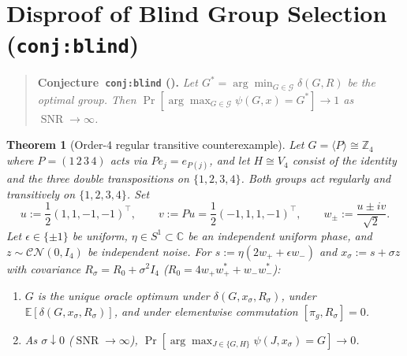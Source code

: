 \documentclass[11pt]{article}
\theoremstyle{plain}
\newtheorem{theorem}{Theorem}
\theoremstyle{definition}
\theoremstyle{remark}
\DeclareMathOperator{\SNR}{SNR}
\begin{document}
\section{Disproof of Blind Group Selection (\texttt{conj:blind})}

\begin{quote}
\textbf{Conjecture~\texttt{conj:blind} (\cite{Thornton2026}).}
\emph{Let $G^* = \arg\min_{G \in \mathcal{G}} \delta(G, R)$ be the optimal group. Then $\Pr[\arg\max_{G \in \mathcal{G}} \psi(G, x) = G^*] \to 1$ as $\SNR \to \infty$.}
\end{quote}

\begin{theorem}[Order-$4$ regular transitive counterexample]\label{thm:blind-v4}
Let $G = \langle P \rangle \cong \mathbb{Z}_4$ where $P = (1\,2\,3\,4)$ acts via $P e_j = e_{P(j)}$, and let $H \cong V_4$ consist of the identity and the three double transpositions on $\{1,2,3,4\}$. Both groups act regularly and transitively on $\{1,2,3,4\}$. Set
\[
u := \frac{1}{2}(1, 1, -1, -1)^\top, \qquad v := Pu = \frac{1}{2}(-1, 1, 1, -1)^\top, \qquad w_\pm := \frac{u \pm iv}{\sqrt{2}}.
\]
Let $\epsilon \in \{\pm 1\}$ be uniform, $\eta \in S^1 \subset \mathbb{C}$ be an independent uniform phase, and $z \sim \mathcal{CN}(0, I_4)$ be independent noise. For $s := \eta(2w_+ + \epsilon w_-)$ and $x_\sigma := s + \sigma z$ with covariance $R_\sigma = R_0 + \sigma^2 I_4$ ($R_0 = 4w_+ w_+^* + w_- w_-^*$):
\begin{enumerate}[label=\textup{(\arabic*)}]
\item $G$ is the unique oracle optimum under $\delta(G, x_\sigma, R_\sigma)$, under $\mathbb{E}[\delta(G, x_\sigma, R_\sigma)]$, and under elementwise commutation $[\pi_g, R_\sigma] = 0$.
\item As $\sigma \downarrow 0$ ($\SNR \to \infty$), $\Pr[\arg\max_{J \in \{G, H\}} \psi(J, x_\sigma) = G] \to 0$.
\end{enumerate}
\end{theorem}
\end{document}
